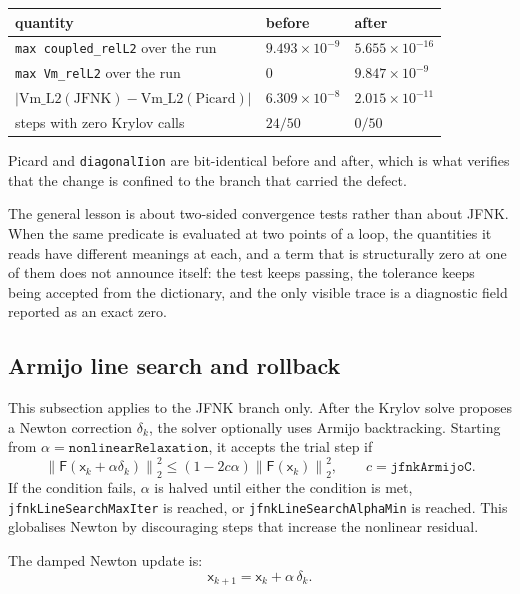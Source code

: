 \documentclass[11pt,a4paper]{article}
\newcommand{\code}[1]{\texttt{\small #1}}
\newcommand{\Fres}{\mathsf{F}}
\newcommand{\norm}[1]{\left\lVert #1 \right\rVert}
\begin{document}
\begin{center}
\begin{tabular}{lll}
\toprule
quantity & before & after \\
\midrule
\code{max coupled\_relL2} over the run & $9.493\times10^{-9}$ & $5.655\times10^{-16}$ \\
\code{max Vm\_relL2} over the run & $0$ & $9.847\times10^{-9}$ \\
$|\text{Vm\_L2}(\text{JFNK})-\text{Vm\_L2}(\text{Picard})|$ & $6.309\times10^{-8}$ & $2.015\times10^{-11}$ \\
steps with zero Krylov calls & $24/50$ & $0/50$ \\
\bottomrule
\end{tabular}
\end{center}

Picard and \code{diagonalIion} are bit-identical before and after, which is what
verifies that the change is confined to the branch that carried the defect.

The general lesson is about two-sided convergence tests rather than about JFNK.
When the same predicate is evaluated at two points of a loop, the quantities it
reads have different meanings at each, and a term that is structurally zero at
one of them does not announce itself: the test keeps passing, the tolerance keeps
being accepted from the dictionary, and the only visible trace is a diagnostic
field reported as an exact zero.

\subsection{Armijo line search and rollback}
\label{sec:rollback}

This subsection applies to the JFNK branch only. After the Krylov solve
proposes a Newton correction $\delta_k$, the solver optionally uses Armijo
backtracking. Starting from $\alpha=\texttt{nonlinearRelaxation}$, it
accepts the trial step if
\begin{equation}
  \norm{\Fres(\mathsf{x}_k+\alpha\delta_k)}_2^2
  \le
  \left(1-2c\alpha\right)
  \norm{\Fres(\mathsf{x}_k)}_2^2,
  \qquad c=\texttt{jfnkArmijoC}.
  \label{eq:armijo}
\end{equation}
If the condition fails, $\alpha$ is halved until either the condition is met,
\code{jfnkLineSearchMaxIter} is reached, or
\code{jfnkLineSearchAlphaMin} is reached. This globalises Newton by discouraging
steps that increase the nonlinear residual.

The damped Newton update is:
$$
\mathsf{x}_{k+1}=\mathsf{x}_k+\alpha\,\delta_k.
$$
\end{document}
